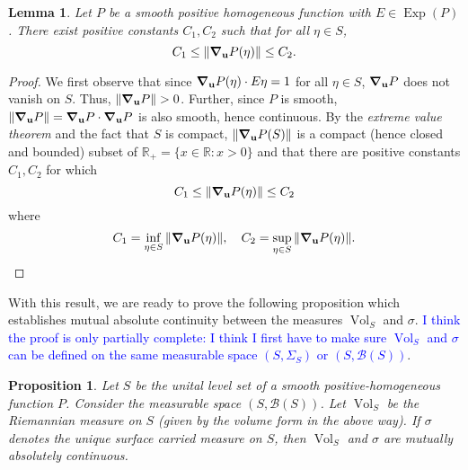 \documentclass{article}
\newcommand\Exp{\operatorname{Exp}}
\newcommand{\R}{\mathbb{R}}
\theoremstyle{theorem}
\newtheorem{lemma}[theorem]{Lemma}
\newtheorem{proposition}[theorem]{Proposition}
\newcommand{\Vol}{\operatorname{Vol}}
\begin{document}
\begin{lemma}\label{lem:boundsGradP}
Let $P$ be a smooth positive homogeneous function with $E \in \Exp(P)$. There exist positive constants $C_1,C_2$ such that for all $\eta\in S$, 
\begin{equation*}
    C_1 \leq \norm{\grad_\mathbf{u} P(\eta)} \leq C_2.
\end{equation*}
\end{lemma}

\begin{proof}
We first observe that since $\grad_\mathbf{u} P(\eta) \cdot E\eta = 1$ for all $\eta\in S$, $\grad_\mathbf{u} P$ does not vanish on $S$. Thus, $\norm{\grad_\mathbf{u} P} > 0$. Further, since $P$ is smooth, $\norm{\grad_\mathbf{u} P} = \grad_\mathbf{u} P \cdot \grad_\mathbf{u} P$ is also smooth, hence continuous. By the \textit{extreme value theorem} and the fact that $S$ is compact, $\norm{\grad_{\mathbf{u}} P(S) }$ is a compact (hence closed and bounded) subset of $\R_+ = \{ x \in \R : x > 0 \}$ and that there are positive constants $C_1,C_2$ for which 
\begin{equation*}
    C_1 \leq \norm{\grad_\mathbf{u} P(\eta)} \leq C_2
\end{equation*}
where
\begin{equation*}
    C_1 = \inf_{\eta\in S}\norm{\grad_{\mathbf{u}} P(\eta) }, \quad C_2 = \sup_{\eta\in S}\norm{\grad_{\mathbf{u}} P(\eta) }.
\end{equation*}
\end{proof}

With this result, we are ready to prove the following proposition which establishes mutual absolute continuity between the measures $\Vol_S$ and $\sigma$. \textcolor{blue}{I think the proof is only partially complete: I think I first have to make sure $\Vol_S$ and $\sigma$ can be defined on the same measurable space $(S,\Sigma_S)$ or $(S,\mathcal{B}(S))$}.

\begin{proposition}
Let $S$ be the unital level set of a smooth positive-homogeneous function $P$. Consider the measurable space $(S,\mathcal{B}(S))$. Let $\Vol_S$ be the Riemannian measure on $S$ (given by the volume form in the above way). If $\sigma$ denotes the unique surface carried measure on $S$, then $\Vol_S$ and $\sigma$ are mutually absolutely continuous.
\end{proposition}
\end{document}
